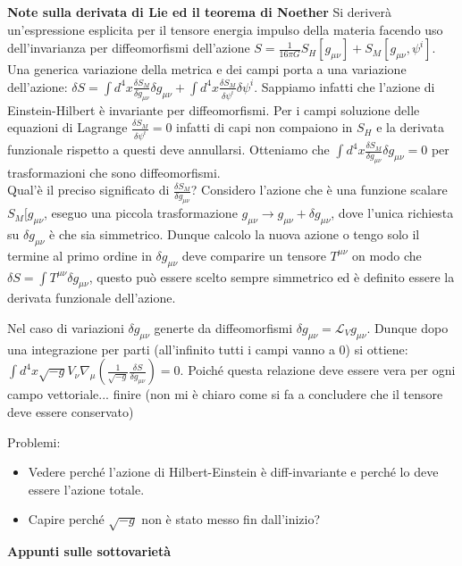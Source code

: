 \documentclass[10pt,a4paper]{article}
\begin{document}
\textbf{Note sulla derivata di Lie ed il teorema di Noether}
Si deriverà un'espressione esplicita per il tensore energia impulso della materia facendo uso dell'invarianza per diffeomorfismi dell'azione $S = \frac{1}{16 \pi G} S_{H}[g_{\mu \nu}] + S_{M}[ g_{\mu \nu}, \psi^{i}]$.  Una generica variazione della metrica e dei campi porta a una variazione dell'azione: $\delta S = \int d^4 x \frac{\delta S_{M}}{\delta g_{\mu \nu}} \delta g_{\mu \nu} + \int d^4 x \frac{\delta S_M}{\delta \psi^i} \delta \psi^{i}$. Sappiamo infatti che l'azione di Einstein-Hilbert è invariante per diffeomorfismi. Per i campi soluzione delle equazioni di Lagrange $\frac{\delta S_M}{\delta \psi^i} = 0$ infatti di capi non compaiono in $S_H$ e la derivata funzionale rispetto a questi deve annullarsi. Otteniamo che $\int d^4 x \frac{\delta S_{M}}{\delta g_{\mu \nu}} \delta g_{\mu \nu} = 0$ per trasformazioni che sono diffeomorfismi.\\
Qual'è il preciso significato di $\frac{\delta S_{M}}{\delta g_{\mu \nu}}$? Considero l'azione che è una funzione scalare $S_M[g_{\mu \nu}$, eseguo una piccola trasformazione $g_{\mu \nu} \rightarrow g_{\mu \nu} + \delta g_{\mu \nu}$, dove l'unica richiesta su $\delta g_{\mu \nu}$ è che sia simmetrico. Dunque calcolo la nuova azione o tengo solo il termine al primo ordine in $\delta g_{\mu \nu}$ deve comparire un tensore $T^{\mu \nu}$ on modo che $\delta S = \int T^{\mu \nu} \delta g_{\mu \nu}$, questo può essere scelto sempre simmetrico ed è definito essere la derivata funzionale dell'azione.

Nel caso di variazioni $\delta g_{\mu \nu}$ generte da diffeomorfismi $\delta g_{\mu \nu} = \mathcal{L}_{V} g_{\mu \nu}$. Dunque dopo una integrazione per parti (all'infinito tutti i campi vanno a 0) si ottiene: $\int d^4 x \sqrt{-g} V_{\nu} \nabla_{\mu} (\frac{1}{\sqrt{-g}} \frac{\delta S}{\delta g_{\mu \nu}}) = 0$. Poiché questa relazione deve essere vera per ogni campo vettoriale... finire (non mi è chiaro come si fa a concludere che il tensore deve essere conservato)

Problemi:
\begin{itemize}
\item Vedere perché l'azione di Hilbert-Einstein è diff-invariante e perché lo deve essere l'azione totale. 
\item Capire perché $\sqrt{-g}$ non è stato messo fin dall'inizio?
\end{itemize}

\textbf{Appunti sulle sottovarietà}
\end{document}
